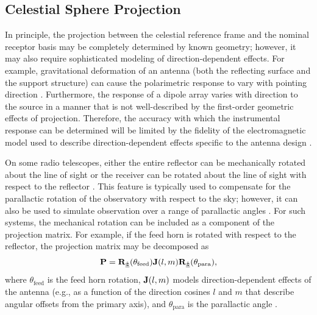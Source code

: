 \subsection{ Celestial Sphere Projection }
\label{sec:calibration_projection}

In principle, the projection between the celestial reference frame and the nominal receptor basis may be completely determined by known geometry; however, it may also require sophisticated modeling of direction-dependent effects.  
%
For example, gravitational deformation of an antenna (both the reflecting surface and the support structure) can cause the polarimetric response to vary with pointing direction
\citep{rh21,2024SPIE13094E..3GI}.
%
Furthermore, the response of a dipole array varies with direction to the source in a manner that is not well-described by the first-order geometric effects of projection.
%
Therefore, the accuracy with which the instrumental response can be determined will be limited by the fidelity of the electromagnetic model used to describe direction-dependent effects specific to the antenna design \citep[e.g.,][]{wbv11,mwb+12,2015RaSc...50...52S}.


On some radio telescopes, either the entire reflector can be mechanically rotated about the line of sight \cite[e.g.,][]{2021PASA...38....9H} or the receiver can be rotated about the line of sight with respect to the reflector \cite[e.g.,][]{swb+96}.
%
This feature is typically used to compensate for the parallactic rotation of the observatory with respect to the sky; however, it can also be used to simulate observation over a range of parallactic angles \citep[e.g.,][]{gcv+23}.
%
For such systems, the mechanical rotation can be included as a component of the projection matrix.
%
For example, if the feed horn is rotated with respect to the reflector, the projection matrix may be decomposed as
%
\begin{equation}
\JM{P} = \vRotation[z](\theta_\mathrm{feed}) 
\JM{J}(l,m) \vRotation[z](\theta_\mathrm{para}),
\end{equation}
%
where $\theta_\mathrm{feed}$ is the feed horn rotation,
$\JM{J}(l,m)$ models direction-dependent effects of the antenna (e.g., as a function of the direction cosines $l$ and $m$ that describe angular offsets from the primary axis), and $\theta_\mathrm{para}$ is the parallactic angle \citep[e.g.,][]{gvc+25}.


